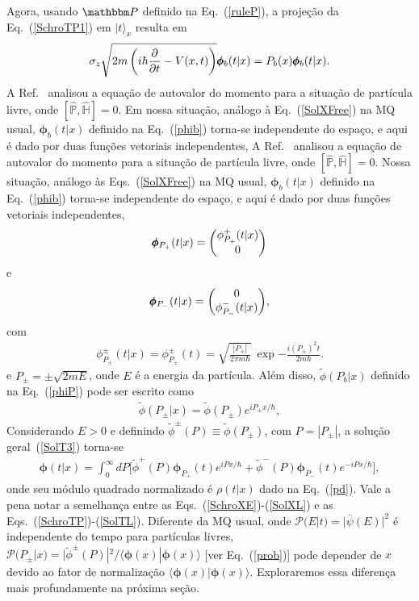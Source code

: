 Agora, usando $\mathbbm P$ definido na Eq.~(\ref{ruleP}), a projeção da Eq.~(\ref{SchroTP1}) em $|t\rangle_x$ resulta em
\begin{equation}\label{SchroTP}
\sigma_z \sqrt{2m\left(i\hbar \pdv{t}-V(x,t)\right)}\pmb{\phi}_b(t|x)=P_b(x)\pmb{\phi}_b(t|x).
\end{equation}
A Ref.~\cite{Dias} analisou a equação de autovalor do momento para a situação de partícula livre, onde $[{\hat {\mathbb P}},\hat {\mathbb H}]=0$. Em nossa situação, análogo à Eq.~(\ref{SolXFree}) na MQ usual, $\pmb{\phi}_b(t|x)$ definido na Eq.~(\ref{phib}) torna-se independente do espaço, e aqui é dado por duas funções vetoriais independentes,
A Ref.~\cite{Dias} analisou a equação de autovalor do momento para a situação de partícula livre, onde $[{\hat {\mathbb P}},\hat {\mathbb H}]=0$. Nossa situação, análogo às Eqs.~(\ref{SolXFree}) na MQ usual, $\pmb{\phi}_b(t|x)$ definido na Eq.~(\ref{phib}) torna-se independente do espaço, e aqui é dado por duas funções vetoriais independentes,
\begin{equation}\label{SolTL}
    \pmb{\phi}_{P_+}(t|x)=\mqty(\phi^+_{P_+}(t|x)   \\  0)
\end{equation}
e
\begin{equation}\label{SolTL}
   \pmb{\phi}_{P_-}(t|x)=\mqty(0  \\  \phi^-_{P_-}(t|x) ),
\end{equation}
com
\begin{eqnarray}\label{SolTFree}
\phi^{\pm}_{P_{\pm}}(t|x)=\phi^{\pm}_{P_{\pm}}(t)=\sqrt{\frac{|P_\pm|}{2\pi
m\hbar}}~\exp{-\frac{i(P_\pm)^2t}{2m\hbar}}.
\end{eqnarray}
e $P_\pm=\pm \sqrt{2mE}$, onde $E$ é a energia da partícula. Além disso, ${\tilde \phi}(P_b|x)$ definido na Eq.~(\ref{phiP}) pode ser escrito como
\begin{eqnarray}\label{phiPFree}
  {\tilde \phi}(P_{\pm}|x)={\tilde \phi}(P_\pm)e^{ iP_{\pm}x/\hbar},
\end{eqnarray} 
Considerando $E>0$ e definindo $\tilde{\phi}^{\pm}(P) \equiv \tilde{\phi} (P_{\pm})$, com $P=|P_\pm|$, a solução geral~(\ref{SolT3}) torna-se
\begin{eqnarray}\label{SolTL}
    \pmb{\phi}(t|x) = \int_0^\infty dP\big[{\tilde \phi}^+(P)\pmb{\phi}_{P_+}(t) e^{iPx/\hbar} + {\tilde \phi}^-(P)  \pmb{\phi}_{P_-}(t)e^{-iPx/\hbar} \big],
\end{eqnarray}
onde seu módulo quadrado normalizado é $\rho(t|x)$ dado na Eq.~(\ref{pd}). Vale a pena notar a semelhança entre as Eqs.~(\ref{SchroXE})-(\ref{SolXL}) e as Eqs.~(\ref{SchroTP})-(\ref{SolTL}). Diferente da MQ usual, onde ${\mathcal P}(E|t)=|{\bar \psi}(E)|^2$ é independente do tempo para partículas livres, ${\mathcal P}(P_{ \pm}|x)=|{\tilde \phi}^{\pm}(P)|^2/\langle \pmb{\phi}(x)|\pmb{\phi}(x)\rangle$ [ver Eq.~(\ref {prob})] pode depender de $x$ devido ao fator de normalização $\langle \pmb{\phi}(x)|\pmb{\phi}(x)\rangle$. Exploraremos essa diferença mais profundamente na próxima seção. 



